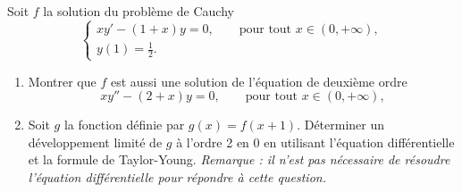 
\begin{exercice}\label{exosession2-0006}

Soit $f$ la solution du problème de Cauchy 
\begin{equation*}
  \begin{cases}
    xy'-(1+x)y=0, \qquad \text{pour tout }x \in (0,+\infty), \\
    y(1)= \frac{1}{2}.
  \end{cases}
\end{equation*}
\begin{enumerate}
\item Montrer que $f$ est aussi une solution de l'équation de deuxième ordre 
  \begin{equation*}
    xy''-(2+x)y=0, \qquad \text{pour tout }x \in (0,+\infty),
  \end{equation*}
\item Soit $g$ la fonction définie par $g(x) = f(x+1)$. Déterminer un développement limité de $g$ à l'ordre 2 en 0 en utilisant l'équation différentielle et la formule de Taylor-Young. \emph{Remarque : il n'est pas nécessaire de résoudre l'équation différentielle pour répondre à cette question.}
\end{enumerate}

\end{exercice}

